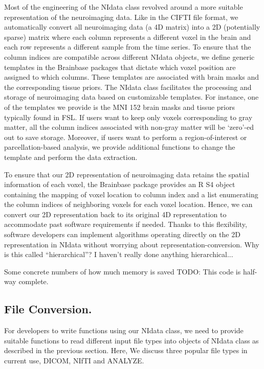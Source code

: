 \documentclass{nature}
\begin{document}
Most of the engineering of the NIdata class revolved around a more suitable
representation of the neuroimaging data. Like in the CIFTI file
format\cite{Glasser2013The},
we automatically convert all neuroimaging data (a 4D matrix)
into a 2D (potentially sparse) matrix where each
column represents a different voxel
in the brain and each row represents
a different sample from the time series. To ensure that the column indices are
compatible across different NIdata objects, we define generic templates in the
Brainbase packages that dictate which voxel position are assigned to which
columns.
These templates are associated with brain masks and the corresponding tissue
priors.
The NIdata class facilitates the processing
and storage of neuroimaging data based on customizable
templates.
For instance, one of the templates we provide is the MNI 152 brain masks and
tissue priors typically found in FSL.
If users want to keep only voxels corresponding to gray matter, all the column
indices associated with non-gray matter will be `zero'-ed out to save storage.
Moreover, if users want to perform a
region-of-interest or parcellation-based analysis, we provide
additional functions to change the template and perform the data extraction.

To ensure that our 2D representation of neuroimaging data retains the
spatial information of each voxel, the Brainbase package provides
an R S4 object containing the mapping of voxel location to column index and
a list enumerating the column indices of neighboring voxels for each voxel
location. Hence, we can convert our 2D representation back to its original
4D representation to accommodate past software requirements if needed.
Thanks to this flexibility, software developers can
implement algorithms operating directly on the 2D representation in
NIdata without worrying about representation-conversion. {\color{red}Why is this
called ``hierarchical''? I haven't really done anything hierarchical...}

{\color{red}Some concrete numbers of how much memory is saved}
{\color{red}TODO: This code is half-way complete.}

\subsection{File Conversion.}
For developers to write functions using our NIdata class, we need to provide
suitable functions to read different input file types into objects of NIdata
class as described in the previous section. Here, We discuss three popular file
types in current use, DICOM, NIfTI and ANALYZE.
\end{document}
